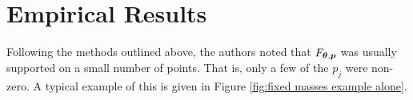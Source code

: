 


\section{Empirical Results}
\label{sec:deconvolution empirical results}
	Following the methods outlined above, the authors noted that $F_{{\bm{{\theta}}}, {\bm{{p}}}}$ was usually supported on a small number of points. That is, only a few of the $p_j$ were non-zero. A typical example of this is given in Figure \ref{fig:fixed masses example alone}.

